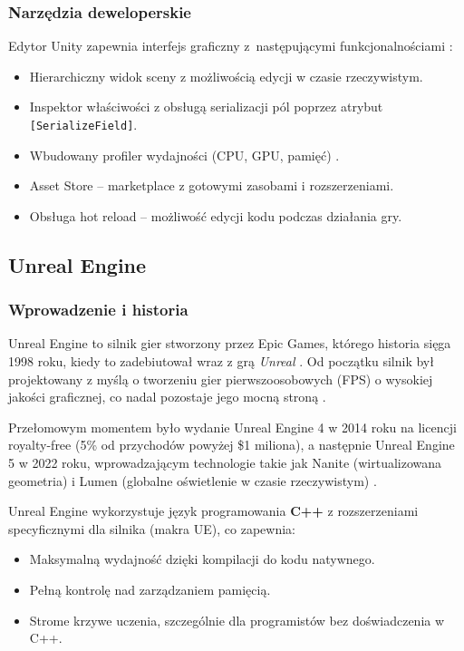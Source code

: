 \subsubsection{Narzędzia deweloperskie}

Edytor Unity zapewnia interfejs graficzny z~następującymi
funkcjonalnościami \cite{unity_wikipedia}:
\begin{itemize}
    \item Hierarchiczny widok sceny z możliwością edycji w czasie
    rzeczywistym.
    \item Inspektor właściwości z obsługą serializacji pól poprzez
    atrybut \texttt{[SerializeField]}.
    \item Wbudowany profiler wydajności (CPU, GPU, pamięć)
    \cite{unity_profiler}.
    \item Asset Store -- marketplace z gotowymi zasobami i
    rozszerzeniami.
    \item Obsługa hot reload -- możliwość edycji kodu podczas działania
    gry.
\end{itemize}

\subsection{Unreal Engine}\label{subsec:unreal}

\subsubsection{Wprowadzenie i historia}

Unreal Engine to silnik gier stworzony przez Epic Games, 
którego historia sięga 1998 roku, kiedy to zadebiutował wraz z 
grą \textit{Unreal} \cite{unreal_wikipedia}. Od początku silnik był projektowany z myślą o 
tworzeniu gier pierwszoosobowych (FPS) o wysokiej jakości graficznej, 
co nadal pozostaje jego mocną stroną \cite{unreal_wikipedia,unreal_docs}.

Przełomowym momentem było wydanie Unreal Engine 4 w 2014 roku na 
licencji royalty-free (5\% od przychodów powyżej \$1 miliona), a 
następnie Unreal Engine 5 w 2022 roku, wprowadzającym 
technologie takie jak Nanite (wirtualizowana geometria) i Lumen 
(globalne oświetlenie w czasie rzeczywistym) \cite{unreal_wikipedia,unreal_nanite,unreal_lumen}.

Unreal Engine wykorzystuje język programowania \textbf{C++} z 
rozszerzeniami specyficznymi dla silnika (makra UE), co zapewnia:
\begin{itemize}
    \item Maksymalną wydajność dzięki kompilacji do kodu natywnego.
    \item Pełną kontrolę nad zarządzaniem pamięcią.
    \item Strome krzywe uczenia, szczególnie dla programistów bez doświadczenia w C++.
\end{itemize}

